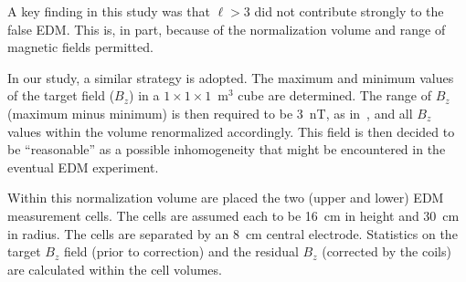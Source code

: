 \documentclass[preprint,12pt]{elsarticle}
\begin{document}
A key finding in this study was that $\ell>3$ did not contribute
strongly to the false EDM.  This is, in part, because of the
normalization volume and range of magnetic fields permitted.

In our study, a similar strategy is adopted.  The maximum and minimum
values of the target field ($B_z$) in a $1\times 1\times 1$~m$^3$ cube
are determined.  The range of $B_z$ (maximum minus minimum) is then
required to be 3~nT, as in~\cite{bib:wkthesis}, and all $B_z$ values
within the volume renormalized accordingly.  This field is then
decided to be ``reasonable'' as a possible inhomogeneity that might be
encountered in the eventual EDM experiment.

Within this normalization volume are placed the two (upper and lower)
EDM measurement cells.  The cells are assumed each to be 16~cm in
height and 30~cm in radius.  The cells are separated by an 8~cm
central electrode.  Statistics on the target $B_z$ field (prior to
correction) and the residual $B_z$ (corrected by the coils) are
calculated within the cell volumes.
\end{document}
